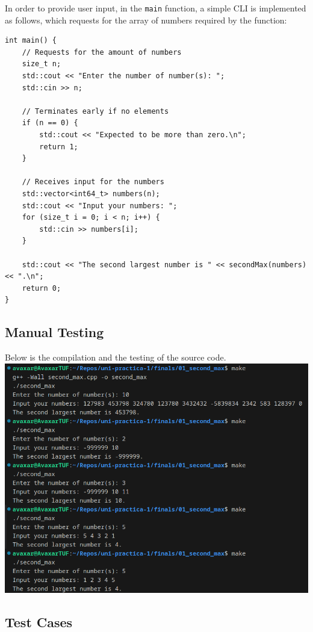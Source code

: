\documentclass[12pt]{article}
\begin{document}
In order to provide user input, in the \texttt{main} function, a simple CLI is implemented as follows, which requests for the array of numbers required by the function:

\begin{verbatim}
int main() {
    // Requests for the amount of numbers
    size_t n;
    std::cout << "Enter the number of number(s): ";
    std::cin >> n;

    // Terminates early if no elements
    if (n == 0) {
        std::cout << "Expected to be more than zero.\n";
        return 1;
    }

    // Receives input for the numbers
    std::vector<int64_t> numbers(n);
    std::cout << "Input your numbers: ";
    for (size_t i = 0; i < n; i++) {
        std::cin >> numbers[i];
    }

    std::cout << "The second largest number is " << secondMax(numbers) << ".\n";
    return 0;
}
\end{verbatim}

\subsection{Manual Testing}
Below is the compilation and the testing of the source code.
\newline\includegraphics[width=\textwidth]{01_second_max}

\subsection{Test Cases}
\end{document}
